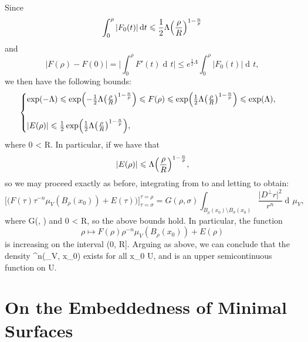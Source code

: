 \documentclass[a4paper, 11pt]{article}
\theoremstyle{plain}
\theoremstyle{definition}
\theoremstyle{remark}
\DeclareMathOperator{\diff}{d \!}
\numberwithin{equation}{subsection}
\def\({}
\def\){}
\begin{document}
Since 
\begin{equation}
\int_{0}^{\rho}\vert F_{0}(t)\vert \diff t \leqslant \frac{1}{2}\Lambda\Bigl(\frac{\rho}{R}\Bigr)^{1-\frac{n}{p}}
\end{equation}
and 
\begin{equation}
\vert F(\rho) - F(0)\vert = \biggl| \int_{0}^{\rho}F'(t)\diff t\biggr| \leqslant e^{\frac{1}{2}\Lambda}\int_{0}^{\rho}\vert F_{0}(t) \vert \diff t,
\end{equation}
we then have the following bounds:
\begin{equation}
\begin{cases}
\exp(-\Lambda) \leqslant \exp\Bigl(-\frac{1}{2}\Lambda\bigl(\frac{\rho}{R}\bigr)^{1-\frac{n}{p}}\Bigr) \leqslant F(\rho) \leqslant \exp\Bigl(\frac{1}{2}\Lambda\bigl(\frac{\rho}{R}\bigr)^{1-\frac{n}{p}}\Bigr) \leqslant \exp(\Lambda), \\
\\
\vert E(\rho)\vert \leqslant \frac{1}{2}\exp\Bigl(\frac{1}{2}\Lambda\bigl(\frac{\rho}{R}\bigr)^{1-\frac{n}{p}}\Bigr),
\end{cases}
\end{equation}
where \(0 < \rho \leqslant R\). In particular, if \(\Lambda {}\) we have that
\begin{equation}
\vert E(\rho) \vert \leqslant \Lambda\Bigl(\frac{\rho}{R}\Bigr)^{1-\frac{n}{p}},
\end{equation}
so we may proceed exactly as before, integrating from \(\rho\) to \(\sigma\) and letting \(\varepsilon {}\) to obtain:
\begin{equation}
\bigl[\bigl(F(\tau)\tau^{-n}\mu_{V}(B_{\rho}(x_{0})) + E(\tau)\bigr)\bigr]_{\tau = \sigma}^{\tau = \rho} = G(\rho,\sigma) \int_{B_{\rho}(x_{0}) \setminus B_{\sigma}(x_{0})} \frac{\vert D^{\perp}r \vert^{2}}{r^{n}} \diff\mu_{V},
\end{equation}
where \(G(\rho, \sigma) \in {}\) and \(0 < \sigma \leqslant \rho \leqslant R\), so the above bounds hold. In particular, the function
\begin{equation}
\rho \longmapsto\!F(\rho)\rho^{-n}\mu_{V}(B_{\rho}(x_0)) + E(\rho)
\end{equation}
is increasing on the interval \((0, R]\). Arguing as above, we can conclude that the density \(\Theta^{n}(\mu_{V}, x_{0})\) exists for all \(x_{0} \in U\), and is an upper semicontinuous function on \(U\).


\section{On the Embeddedness of Minimal Surfaces}
\label{Paper}
\end{document}
